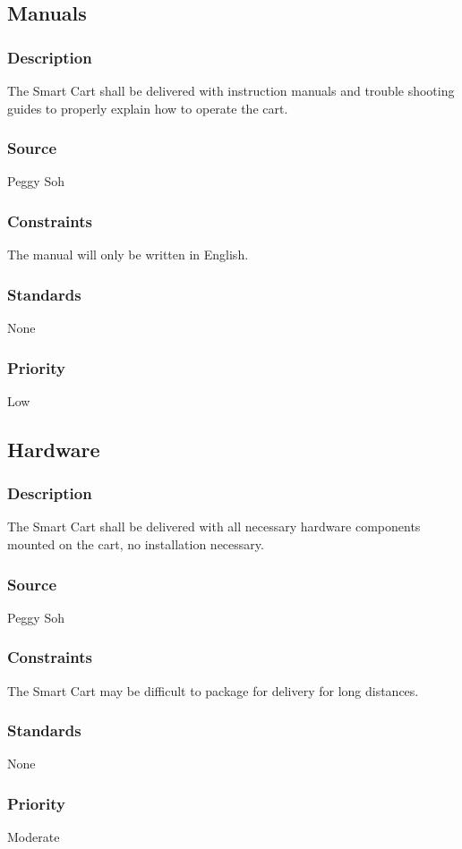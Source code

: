 \subsection{Manuals}
\subsubsection{Description}
The Smart Cart shall be delivered with instruction manuals and trouble shooting guides to properly explain how to operate the cart. 
\subsubsection{Source}
Peggy Soh
\subsubsection{Constraints}
The manual will only be written in English.
\subsubsection{Standards}
None
\subsubsection{Priority}
Low


\subsection{Hardware}
\subsubsection{Description}
The Smart Cart shall be delivered with all necessary hardware components mounted on the cart, no installation necessary. 
\subsubsection{Source}
Peggy Soh
\subsubsection{Constraints}
The Smart Cart may be difficult to package for delivery for long distances.
\subsubsection{Standards}
None
\subsubsection{Priority}
Moderate
